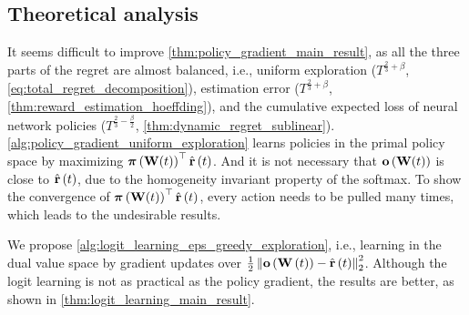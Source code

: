 \subsection{Theoretical analysis}
\label{subsec:theoretical_analyses_logit_learning}

It seems difficult to improve \cref{thm:policy_gradient_main_result}, as all the three parts of the regret are almost balanced, i.e., uniform exploration ($ T^{\frac{2}{3} + \beta}$, \cref{eq:total_regret_decomposition}), estimation error ($ T^{\frac{2}{3} + \beta} $, \cref{thm:reward_estimation_hoeffding}), and the cumulative expected loss of neural network policies ($ T^{\frac{2}{3} - \frac{\beta}{2}} $, \cref{thm:dynamic_regret_sublinear}). \cref{alg:policy_gradient_uniform_exploration} learns policies in the primal policy space by maximizing ${\boldsymbol{\pi}}\left( {\mathbf{W}}(t) \right)^\top \hat{{\mathbf{r}}}\left(t\right)$. And it is not necessary that ${\mathbf{o}}\left( {\mathbf{W}}(t)\right)$ is close to $\hat{{\mathbf{r}}}\left(t\right)$, due to the homogeneity invariant property of the softmax. To show the convergence of ${\boldsymbol{\pi}}\left( {\mathbf{W}}(t) \right)^\top \hat{{\mathbf{r}}}\left(t\right)$, every action needs to be pulled many times, which leads to the undesirable results.

We propose \cref{alg:logit_learning_eps_greedy_exploration}, i.e., learning in the dual value space by gradient updates over $\frac{1}{2} \left\| {\mathbf{o}}\left( {\mathbf{W}}\left(t\right)\right) - \hat{{\mathbf{r}}}\left(t\right) \right\|_2^2$. Although the logit learning is not as practical as the policy gradient, the results are better, as shown in \cref{thm:logit_learning_main_result}.

